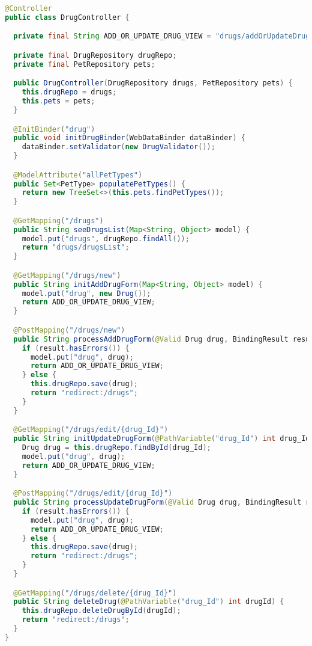 \documentclass[12pt, a4paper]{article}
\begin{document}
\begin{lstlisting}[language=Java, title='DrugController.java']
@Controller
public class DrugController {

  private final String ADD_OR_UPDATE_DRUG_VIEW = "drugs/addOrUpdateDrug";

  private final DrugRepository drugRepo;
  private final PetRepository pets;

  public DrugController(DrugRepository drugs, PetRepository pets) {
    this.drugRepo = drugs;
    this.pets = pets;
  }

  @InitBinder("drug")
  public void initDrugBinder(WebDataBinder dataBinder) {
    dataBinder.setValidator(new DrugValidator());
  }

  @ModelAttribute("allPetTypes")
  public Set<PetType> populatePetTypes() {
    return new TreeSet<>(this.pets.findPetTypes());
  }

  @GetMapping("/drugs")
  public String seeDrugsList(Map<String, Object> model) {
    model.put("drugs", drugRepo.findAll());
    return "drugs/drugsList";
  }

  @GetMapping("/drugs/new")
  public String initAddDrugForm(Map<String, Object> model) {
    model.put("drug", new Drug());
    return ADD_OR_UPDATE_DRUG_VIEW;
  }

  @PostMapping("/drugs/new")
  public String processAddDrugForm(@Valid Drug drug, BindingResult result, Map<String, Object> model) {
    if (result.hasErrors()) {
      model.put("drug", drug);
      return ADD_OR_UPDATE_DRUG_VIEW;
    } else {
      this.drugRepo.save(drug);
      return "redirect:/drugs";
    }
  }

  @GetMapping("/drugs/edit/{drug_Id}")
  public String initUpdateDrugForm(@PathVariable("drug_Id") int drug_Id, Map<String, Object> model) {
    Drug drug = this.drugRepo.findById(drug_Id);
    model.put("drug", drug);
    return ADD_OR_UPDATE_DRUG_VIEW;
  }

  @PostMapping("/drugs/edit/{drug_Id}")
  public String processUpdateDrugForm(@Valid Drug drug, BindingResult result, ModelMap model) {
    if (result.hasErrors()) {
      model.put("drug", drug);
      return ADD_OR_UPDATE_DRUG_VIEW;
    } else {
      this.drugRepo.save(drug);
      return "redirect:/drugs";
    }
  }

  @GetMapping("/drugs/delete/{drug_Id}")
  public String deleteDrug(@PathVariable("drug_Id") int drugId) {
    this.drugRepo.deleteDrugById(drugId);
    return "redirect:/drugs";
  }
}
\end{lstlisting}
\end{document}

